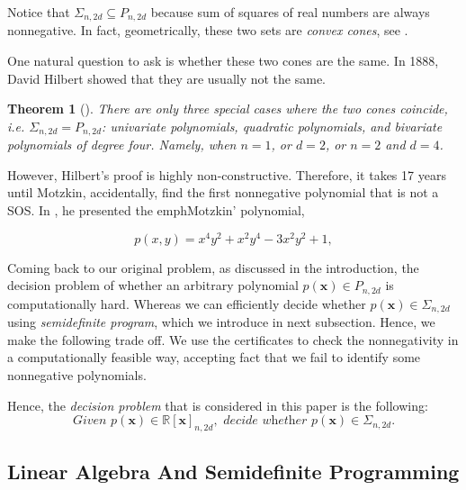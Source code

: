 \documentclass[12pt]{amsart}
\numberwithin{equation}{section}
\newtheorem{thm}{Theorem}
\theoremstyle{definition}
\numberwithin{thm}{section}
\begin{document}
Notice that $\Sigma_{n,2d} \subseteq P_{n, 2d}$ because sum of squares of real numbers are always nonnegative. 
In fact, geometrically, these two sets are \emph{convex cones}, see \cite[Chapter~3]{Blekherman:Parrilo:Thomas}.

One natural question to ask is whether these two cones are the same. In 1888, David Hilbert showed that they are usually not the same.

\begin{thm} [\cite{hilbert_david_1888_1428214}]
     There are only three special cases where the two cones coincide, i.e. $\Sigma_{n,2d} = P_{n, 2d}$: 
     univariate polynomials, quadratic polynomials, and bivariate polynomials of degree four. Namely, when $n = 1$, or $d = 2$, or $n = 2$ and $d = 4$.
\end{thm}

However, Hilbert's proof is highly non-constructive. 
Therefore, it takes 17 years until Motzkin, accidentally,
find the first nonnegative polynomial that is not a SOS. 
In \cite{motzkin1967arithmetic}, he presented the emph{Motzkin' polynomial},

\begin{equation*}
     p(x, y) = x^4y^2 + x^2y^4 - 3 x^2y^2 + 1,
\end{equation*}

Coming back to our original problem, as discussed in the introduction, the decision problem of whether an arbitrary polynomial $p(\mathbf{x}) \in P_{n, 2d}$ is computationally hard.
Whereas we can efficiently decide whether $p(\mathbf{x}) \in \Sigma_{n, 2d}$ using \emph{semidefinite program}, which we introduce in next subsection. 
Hence, we make the following trade off.
We use the certificates to check the nonnegativity in a computationally feasible way,
accepting fact that we fail to identify some nonnegative polynomials.

Hence, the \emph{decision problem} that is considered in this paper is the following: 
\begin{equation}
     \textit{Given } p(\mathbf{x}) \in \mathbb{R}[\mathbf{x}]_{n, 2d}, \textit{ decide whether } p(\mathbf{x}) \in \Sigma_{n, 2d} \label{eq:dp}.
\end{equation}

\subsection{Linear Algebra And Semidefinite Programming}
\label{Sec:Linear Algebra}
\end{document}
